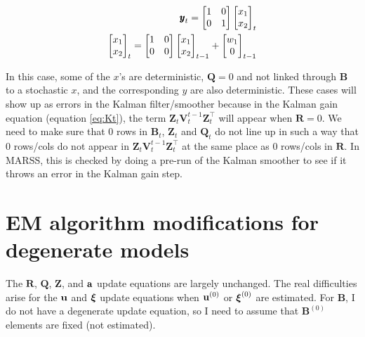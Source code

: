 \documentclass[]{article}
\def\xixi{\mbox{\boldmath $\xi$}}
\def\ZZ{\mbox{$\mathbf Z$}}	\def\zz{\mbox{$\mathbf z$}}
\def\BB{\mbox{$\mathbf B$}}	\def\bb{\mbox{$\mathbf b$}}
\def\QQ{\mbox{$\mathbf Q$}}	 \def\qq{\mbox{$\mathbf q$}}
\def\RR{\mbox{$\mathbf R$}}	 \def\rr{\mbox{$\mathbf r$}}
\def\VV{\mbox{$\pmb{V}$}}	\def\vv{\mbox{$\pmb{v}$}}
\begin{document}
\begin{equation}
\begin{split}
\yy_t=\begin{bmatrix}
1&0\\
0&1
\end{bmatrix}
\begin{bmatrix}
x_1\\x_2
\end{bmatrix}_t\\
\begin{bmatrix}
x_1\\x_2
\end{bmatrix}_t=
\begin{bmatrix}
1&0\\
0&0
\end{bmatrix}
\begin{bmatrix}
x_1\\x_2
\end{bmatrix}_{t-1}
+
\begin{bmatrix}
w_1\\0
\end{bmatrix}_{t-1}
\end{split}
\end{equation}

In this case, some of the $x$'s are deterministic, $\QQ=0$ and not linked through $\BB$ to a stochastic $x$, and the corresponding $y$ are also deterministic.  These cases will show up as errors in the Kalman filter/smoother because in the Kalman gain equation (equation \ref{eq:Kt}), the term $\ZZ_t\VV_t^{t-1}\ZZ_t^\top$ will appear when $\RR=0$.  We need to make sure that 0 rows in $\BB_t$, $\ZZ_t$ and $\QQ_t$ do not line up in such a way that 0 rows/cols do not appear in $\ZZ_t\VV_t^{t-1}\ZZ_t^\top$ at the same place as 0 rows/cols in $\RR$.  In MARSS, this is checked by doing a pre-run of the Kalman smoother to see if it throws an error in the Kalman gain step. 

\section{EM algorithm modifications for degenerate models}

The $\RR$, $\QQ$, $\ZZ$, and $\aa$ update equations are largely unchanged.  The real difficulties arise for the $\uu$ and $\xixi$ update equations when $\uu^{(0)}$ or $\xixi^{(0)}$ are estimated.  For $\BB$, I do not have a degenerate update equation, so I need to assume that $\BB^{(0)}$ elements are fixed (not estimated).
\end{document}

